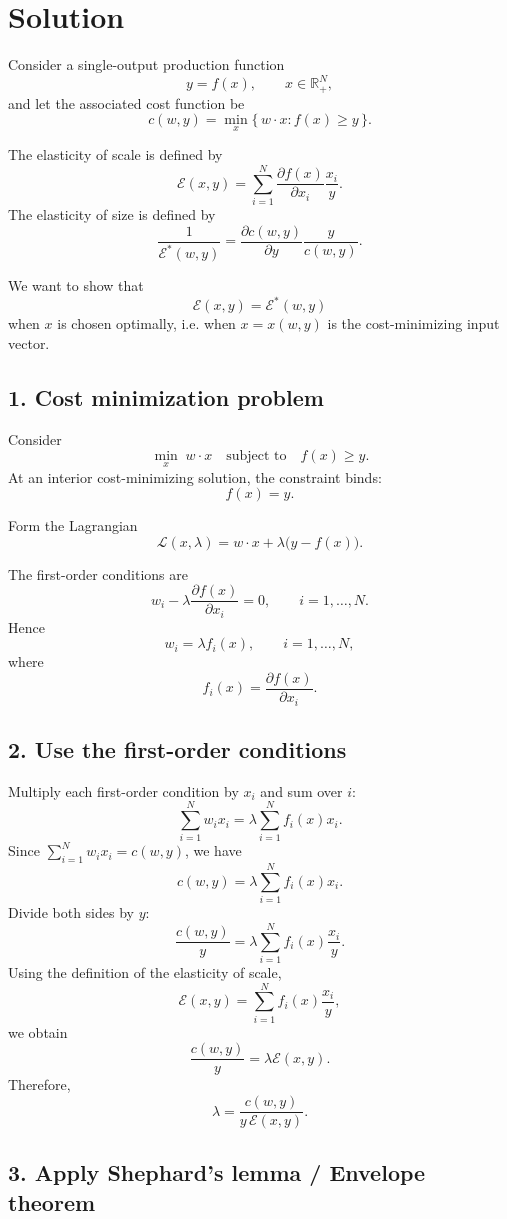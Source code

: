 \section*{Solution}

Consider a single-output production function
\[
y=f(x), \qquad x\in \mathbb{R}_+^N,
\]
and let the associated cost function be
\[
c(w,y)=\min_x \{\, w\cdot x : f(x)\ge y \,\}.
\]

The elasticity of scale is defined by
\[
\mathcal E(x,y)
=
\sum_{i=1}^N \frac{\partial f(x)}{\partial x_i}\frac{x_i}{y}.
\]
The elasticity of size is defined by
\[
\frac{1}{\mathcal E^*(w,y)}
=
\frac{\partial c(w,y)}{\partial y}\frac{y}{c(w,y)}.
\]

We want to show that
\[
\mathcal E(x,y)=\mathcal E^*(w,y)
\]
when \(x\) is chosen optimally, i.e. when \(x=x(w,y)\) is the cost-minimizing input vector.

\subsection*{1. Cost minimization problem}

Consider
\[
\min_x \; w\cdot x
\quad \text{subject to} \quad
f(x)\ge y.
\]
At an interior cost-minimizing solution, the constraint binds:
\[
f(x)=y.
\]

Form the Lagrangian
\[
\mathcal L(x,\lambda)=w\cdot x+\lambda\bigl(y-f(x)\bigr).
\]

The first-order conditions are
\[
w_i-\lambda \frac{\partial f(x)}{\partial x_i}=0,
\qquad i=1,\dots,N.
\]
Hence
\[
w_i=\lambda f_i(x),
\qquad i=1,\dots,N,
\]
where
\[
f_i(x)=\frac{\partial f(x)}{\partial x_i}.
\]

\subsection*{2. Use the first-order conditions}

Multiply each first-order condition by \(x_i\) and sum over \(i\):
\[
\sum_{i=1}^N w_i x_i
=
\lambda \sum_{i=1}^N f_i(x)x_i.
\]
Since \(\sum_{i=1}^N w_i x_i = c(w,y)\), we have
\[
c(w,y)=\lambda \sum_{i=1}^N f_i(x)x_i.
\]
Divide both sides by \(y\):
\[
\frac{c(w,y)}{y}
=
\lambda \sum_{i=1}^N f_i(x)\frac{x_i}{y}.
\]
Using the definition of the elasticity of scale,
\[
\mathcal E(x,y)=\sum_{i=1}^N f_i(x)\frac{x_i}{y},
\]
we obtain
\[
\frac{c(w,y)}{y}=\lambda \mathcal E(x,y).
\]
Therefore,
\[
\lambda=\frac{c(w,y)}{y\,\mathcal E(x,y)}.
\]

\subsection*{3. Apply Shephard's lemma / Envelope theorem}

